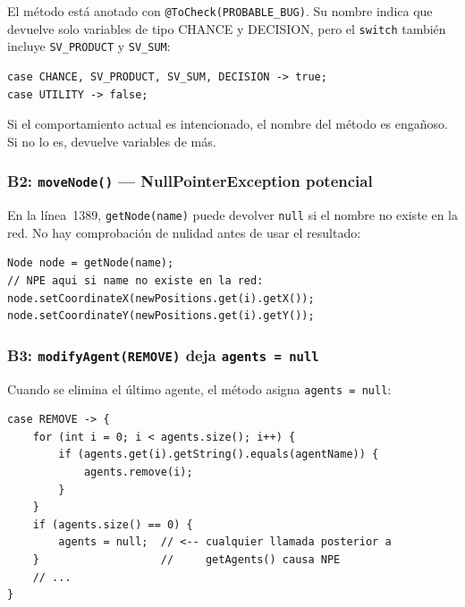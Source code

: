 \documentclass[11pt,a4paper]{article}
\newcommand{\code}[1]{\texttt{#1}}
\begin{document}
El método está anotado con \code{@ToCheck(PROBABLE\_BUG)}.  Su nombre
indica que devuelve solo variables de tipo CHANCE y DECISION, pero el
\code{switch} también incluye \code{SV\_PRODUCT} y \code{SV\_SUM}:

\begin{lstlisting}[caption={B1: el \texttt{switch} incluye tipos no mencionados en el nombre.},
                   label=lst:b1]
case CHANCE, SV_PRODUCT, SV_SUM, DECISION -> true;
case UTILITY -> false;
\end{lstlisting}

Si el comportamiento actual es intencionado, el nombre del método es
engañoso.  Si no lo es, devuelve variables de más.

\subsubsection{B2: \texttt{moveNode()} --- NullPointerException potencial}

En la línea~1389, \code{getNode(name)} puede devolver \code{null} si el
nombre no existe en la red.  No hay comprobación de nulidad antes de usar
el resultado:

\begin{lstlisting}[caption={B2: acceso sin null-check sobre el resultado de \texttt{getNode()}.},
                   label=lst:b2]
Node node = getNode(name);
// NPE aqui si name no existe en la red:
node.setCoordinateX(newPositions.get(i).getX());
node.setCoordinateY(newPositions.get(i).getY());
\end{lstlisting}

\subsubsection{B3: \texttt{modifyAgent(REMOVE)} deja \texttt{agents = null}}

Cuando se elimina el último agente, el método asigna
\code{agents = null}:

\begin{lstlisting}[caption={B3: la asignación \texttt{agents = null} causa NPE posterior.},
                   label=lst:b3]
case REMOVE -> {
    for (int i = 0; i < agents.size(); i++) {
        if (agents.get(i).getString().equals(agentName)) {
            agents.remove(i);
        }
    }
    if (agents.size() == 0) {
        agents = null;  // <-- cualquier llamada posterior a
    }                   //     getAgents() causa NPE
    // ...
}
\end{lstlisting}
\end{document}
